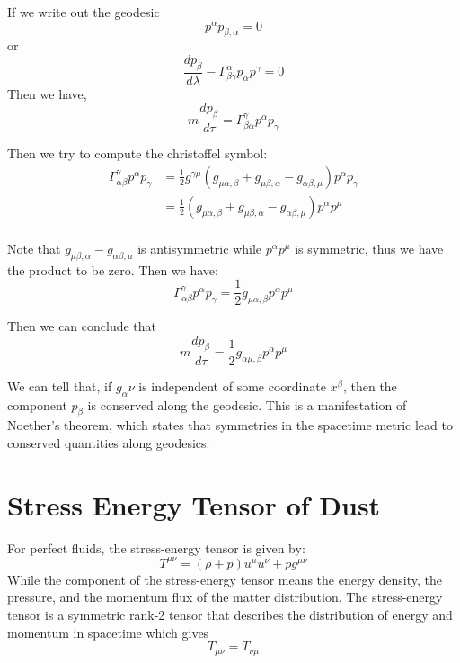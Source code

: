 \documentclass{article}
\begin{document}
If we write out the geodesic
\begin{equation}
    p^\alpha p_{\beta;\alpha}=0
\end{equation}
or
\begin{equation}
    \frac{dp_\beta}{d\lambda}-\Gamma^\alpha_{\beta\gamma}p_\alpha p^\gamma=0
\end{equation}
Then we have,
\begin{equation}
    m\frac{dp_\beta}{d\tau}=\Gamma^\gamma_{\beta\alpha}p^\alpha p_\gamma
\end{equation}

Then we try to compute the christoffel symbol:
\begin{equation}
    \begin{split}
    \Gamma^\gamma_{\alpha\beta}p^\alpha p_\gamma &= \frac{1}{2}g^{\gamma\mu}\left(g_{\mu\alpha,\beta}+g_{\mu\beta,\alpha}-g_{\alpha\beta,\mu}\right)p^\alpha p_\gamma\\
    &= \frac{1}{2}\left(g_{\mu\alpha,\beta}+g_{\mu\beta,\alpha}-g_{\alpha\beta,\mu}\right)p^\alpha p^\mu\\
    \end{split}
\end{equation}

Note that $g_{\mu\beta,\alpha}-g_{\alpha\beta,\mu}$ is antisymmetric while $p^\alpha p^\mu$ is symmetric, thus we have the product to be zero. Then we have:
\begin{equation}
    \Gamma^\gamma_{\alpha\beta}p^\alpha p_\gamma = \frac{1}{2}g_{\mu\alpha,\beta}p^\alpha p^\mu
\end{equation}

Then we can conclude that
\begin{equation}
    \boxed{m\frac{dp_\beta}{d\tau}=\frac{1}{2}g_{\alpha\mu,\beta}p^\alpha p^\mu}
\end{equation}

We can tell that, if $g_\alpha\nu$ is independent of some coordinate $x^\beta$, then the component $p_\beta$ is conserved along the geodesic. This is a manifestation of Noether's theorem, which states that symmetries in the spacetime metric lead to conserved quantities along geodesics.

\section{Stress Energy Tensor of Dust}
For perfect fluids, the stress-energy tensor is given by:
\begin{equation}
T^{\mu\nu} = (\rho + p) u^\mu u^\nu + p g^{\mu\nu}
\end{equation}
While the component of the stress-energy tensor means the energy density, the pressure, and the momentum flux of the matter distribution. The stress-energy tensor is a symmetric rank-2 tensor that describes the distribution of energy and momentum in spacetime which gives
\begin{equation}
    T_{\mu\nu}=T_{\nu\mu}
\end{equation}
\end{document}
